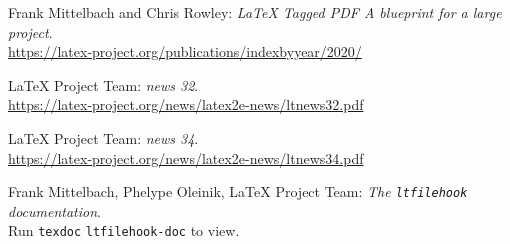 \documentclass{ltnews}
\providecommand\Dash {\unskip \textemdash}
\begin{document}
\medskip

\begin{thebibliography}{9}

\fontsize{9.3}{11.3}\selectfont

 Frank Mittelbach and Chris Rowley:
  \emph{\LaTeX{} Tagged PDF \Dash A blueprint for a large project}.\\
  \url{https://latex-project.org/publications/indexbyyear/2020/}



 \LaTeX{} Project Team:
  \emph{\LaTeXe{} news 32}.\\
  \url{https://latex-project.org/news/latex2e-news/ltnews32.pdf}


 \LaTeX{} Project Team:
  \emph{\LaTeXe{} news 34}.\\
  \url{https://latex-project.org/news/latex2e-news/ltnews34.pdf}

 Frank Mittelbach, Phelype Oleinik, \LaTeX{} Project Team:
  \emph{The \texttt{\upshape ltfilehook} documentation}.\\
  Run \texttt{texdoc} \texttt{ltfilehook-doc} to view.
\end{thebibliography}
\end{document}
